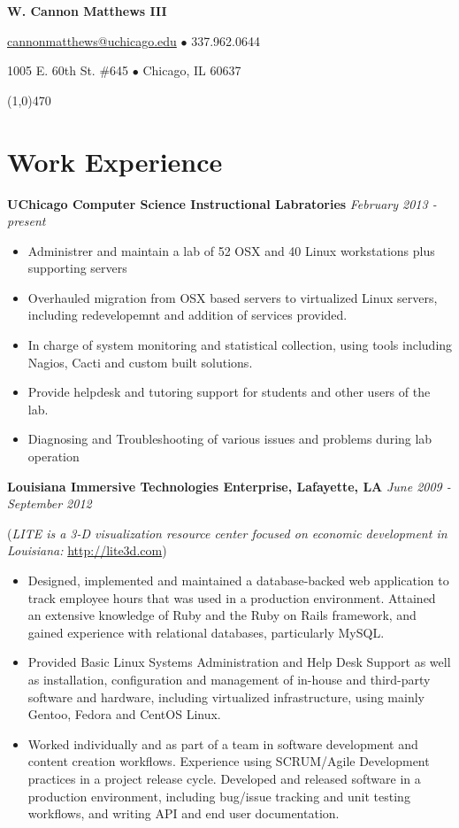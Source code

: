 \documentclass[11pt,letterpaper]{article} %
\begin{document}
 
    \centerline{\LARGE \bf W. Cannon Matthews III} 
    \centerline{ \href{mailto:cannonmatthews@uchicago.edu}{cannonmatthews@uchicago.edu} $\bullet$ 337.962.0644 } 
    \centerline{1005 E. 60th St. \#645 $\bullet$ Chicago, IL 60637 }
    \line(1,0){470} 
%
    \section*{Work Experience} 
        \textbf{UChicago Computer Science Instructional Labratories} \hfill \textit{February 2013 - present }
            \begin{itemize}
            \item Administrer and maintain a lab of 52 OSX and 40 Linux workstations plus supporting servers
            \item Overhauled migration from OSX based servers to virtualized Linux servers, including redevelopemnt and addition of services provided.
            \item In charge of system monitoring and statistical collection, using tools including Nagios, Cacti and custom built solutions. 
            \item Provide helpdesk and tutoring support for students and other users of the lab. 
            \item Diagnosing and Troubleshooting of various issues and problems during lab operation
            \end{itemize}
        \textbf{Louisiana Immersive Technologies Enterprise, Lafayette, LA} \hfill \textit{June 2009 - September 2012} 

            \begin{footnotesize}
                (\textit{LITE is a 3-D visualization resource center focused on economic development in Louisiana: }\url{http://lite3d.com})
            \end{footnotesize}
            \begin{itemize} 
            \item  Designed, implemented and maintained a database-backed web application to track 
                   employee hours that was used in a production environment. Attained an extensive knowledge of Ruby and the 
                   Ruby on Rails framework, and gained experience with relational databases, particularly MySQL.
            \item  Provided Basic Linux Systems Administration and Help Desk Support as well as installation, configuration and 
                   management of in-house and third-party software and hardware, including virtualized infrastructure, using mainly Gentoo, Fedora and CentOS Linux.
            \item  Worked individually and as part of a team in software development and content creation workflows.
                   Experience using SCRUM/Agile Development practices in a project release cycle. Developed and 
                   released software in a production environment, including bug/issue tracking and unit testing workflows, 
                   and writing API and end user documentation. 
            \end{itemize} 
\end{document}
